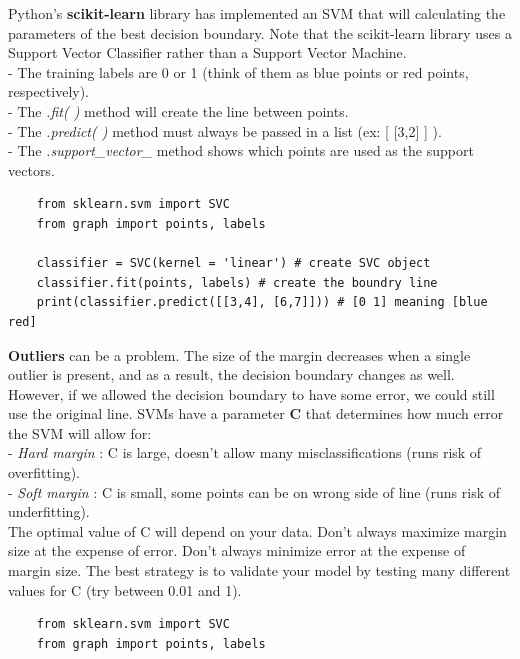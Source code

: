 \documentclass[11pt, a4paper]{article}
\begin{document}
\begin{spacing}{1.1}
	Python’s \textbf{scikit-learn} library has implemented an SVM that will calculating the parameters of the best decision boundary. Note that the scikit-learn library uses a Support Vector Classifier rather than a Support Vector Machine. \\
	\hspace*{2mm} - The training labels are 0 or 1 (think of them as blue points or red points, respectively). \\
	\hspace*{2mm} - The \textit{.fit( )} method will create the line between points. \\
	\hspace*{2mm} - The \textit{.predict( )} method must always be passed in a list (ex: [ [3,2] ] ). \\
	\hspace*{2mm} - The \textit{.support\_vector\_} method shows which points are used as the support vectors.
	\begin{lstlisting}
	from sklearn.svm import SVC
	from graph import points, labels
	
	classifier = SVC(kernel = 'linear') # create SVC object
	classifier.fit(points, labels) # create the boundry line
	print(classifier.predict([[3,4], [6,7]])) # [0 1] meaning [blue red] \end{lstlisting} \vspace*{1mm}
	\textbf{Outliers} can be a problem. The size of the margin decreases when a single outlier is present, and as a result, the decision boundary changes as well. However, if we allowed the decision boundary to have some error, we could still use the original line. SVMs have a parameter \textbf{C} that determines how much error the SVM will allow for: \\
	\hspace*{2mm} - \textit{Hard margin} : C is large, doesn't allow many misclassifications (runs risk of overfitting). \\
	\hspace*{2mm} - \textit{Soft margin} : C is small, some points can be on wrong side of line (runs risk of underfitting). \vspace*{1mm} \\
	The optimal value of C will depend on your data. Don’t always maximize margin size at the expense of error. Don’t always minimize error at the expense of margin size. The best strategy is to validate your model by testing many different values for C (try between 0.01 and 1).
	\begin{lstlisting}
	from sklearn.svm import SVC
	from graph import points, labels
	

\end{lstlisting}
\end{spacing}
\end{document}
